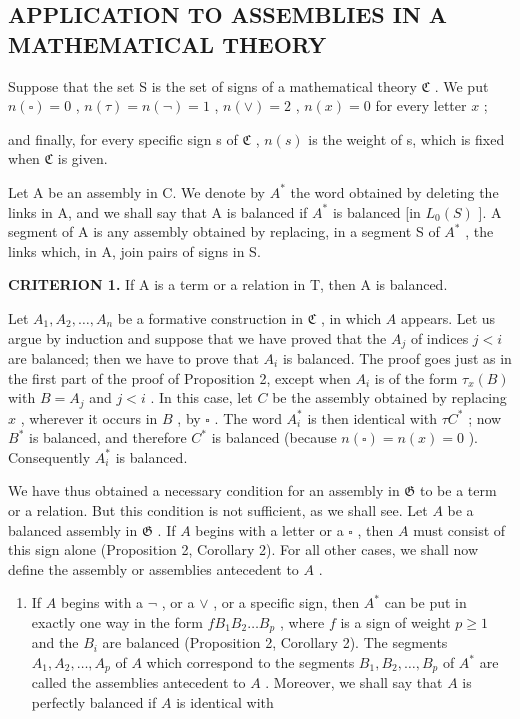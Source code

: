 \subsection{APPLICATION TO ASSEMBLIES IN A MATHEMATICAL THEORY}

Suppose that the set S is the set of signs of a mathematical theory \(\mathfrak{C}\) . We put \(n(\square) = 0\) , \(n(\tau) = n(\neg) = 1\) , \(n(\vee) = 2\) , \(n(x) = 0\) for every letter \(x\) ;

and finally, for every specific sign s of \(\mathfrak{C}\) , \(n(s)\) is the weight of s, which is fixed when \(\mathfrak{C}\) is given.

Let A be an assembly in C. We denote by \(A^{*}\) the word obtained by deleting the links in A, and we shall say that A is balanced if \(A^{*}\) is balanced {[}in \(L_{0}(S)\) {]}. A segment of A is any assembly obtained by replacing, in a segment S of \(A^{*}\) , the links which, in A, join pairs of signs in S.

\textbf{CRITERION 1.} If A is a term or a relation in T, then A is balanced.

Let \(A_1, A_2, \ldots, A_n\) be a formative construction in \(\mathfrak{C}\) , in which \(A\) appears. Let us argue by induction and suppose that we have proved that the \(A_j\) of indices \(j < i\) are balanced; then we have to prove that \(A_i\) is balanced. The proof goes just as in the first part of the proof of Proposition 2, except when \(A_i\) is of the form \(\tau_x(B)\) with \(B = A_j\) and \(j < i\) . In this case, let \(C\) be the assembly obtained by replacing \(x\) , wherever it occurs in \(B\) , by \(\square\) . The word \(A_i^*\) is then identical with \(\tau C^*\) ; now \(B^*\) is balanced, and therefore \(C^*\) is balanced (because \(n(\square) = n(x) = 0\) ). Consequently \(A_i^*\) is balanced.

We have thus obtained a necessary condition for an assembly in \(\mathfrak{G}\) to be a term or a relation. But this condition is not sufficient, as we shall see. Let \(A\) be a balanced assembly in \(\mathfrak{G}\) . If \(A\) begins with a letter or a \(\square\) , then \(A\) must consist of this sign alone (Proposition 2, Corollary 2). For all other cases, we shall now define the assembly or assemblies antecedent to \(A\) .

\begin{enumerate}
\def\labelenumi{(\arabic{enumi})}
\tightlist
\item
  If \(A\) begins with a \(\lnot\) , or a \(\vee\) , or a specific sign, then \(A^*\) can be put in exactly one way in the form \(fB_1B_2\ldots B_p\) , where \(f\) is a sign of weight \(p \geqslant 1\) and the \(B_i\) are balanced (Proposition 2, Corollary 2). The segments \(A_1, A_2, \ldots, A_p\) of \(A\) which correspond to the segments \(B_1, B_2, \ldots, B_p\) of \(A^*\) are called the assemblies antecedent to \(A\) . Moreover, we shall say that \(A\) is perfectly balanced if \(A\) is identical with
\end{enumerate}

